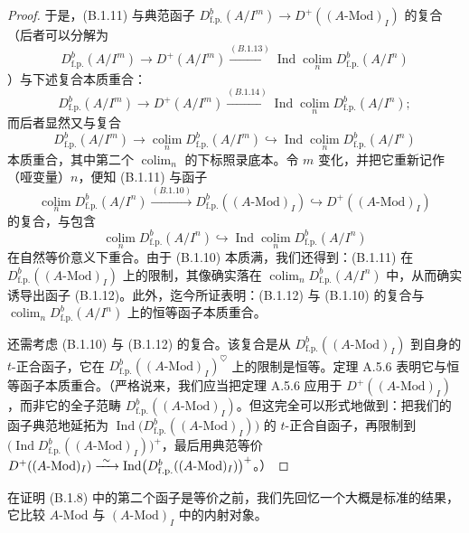 \begin{proof}
于是，(B.1.11) 与典范函子 $D^b_{\mathrm{f.p.}}(A/I^m)\to D^+((A\text{-}\mathrm{Mod})_I)$ 的复合（后者可以分解为
\[
D^b_{\mathrm{f.p.}}(A/I^m)\to D^+(A/I^m)\xrightarrow{(B.1.13)}\operatorname{Ind}\operatorname*{colim}_n D^b_{\mathrm{f.p.}}(A/I^n)
\]
）与下述复合本质重合：
\[
D^b_{\mathrm{f.p.}}(A/I^m)\to D^+(A/I^m)\xrightarrow{(B.1.14)}\operatorname{Ind}\operatorname*{colim}_n D^b_{\mathrm{f.p.}}(A/I^n);
\]
而后者显然又与复合
\[
D^b_{\mathrm{f.p.}}(A/I^m)\to\operatorname*{colim}_n D^b_{\mathrm{f.p.}}(A/I^m)\hookrightarrow\operatorname{Ind}\operatorname*{colim}_n D^b_{\mathrm{f.p.}}(A/I^n)
\]
本质重合，其中第二个 $\operatorname{colim}_n$ 的下标照录底本。令 $m$ 变化，并把它重新记作（哑变量）$n$，便知 (B.1.11) 与函子
\[
\operatorname*{colim}_n D^b_{\mathrm{f.p.}}(A/I^n)\xrightarrow{(B.1.10)}D^b_{\mathrm{f.p.}}((A\text{-}\mathrm{Mod})_I)\hookrightarrow D^+((A\text{-}\mathrm{Mod})_I)
\]
的复合，与包含
\[
\operatorname*{colim}_n D^b_{\mathrm{f.p.}}(A/I^n)\hookrightarrow\operatorname{Ind}\operatorname*{colim}_n D^b_{\mathrm{f.p.}}(A/I^n)
\]
在自然等价意义下重合。由于 (B.1.10) 本质满，我们还得到：(B.1.11) 在 $D^b_{\mathrm{f.p.}}((A\text{-}\mathrm{Mod})_I)$ 上的限制，其像确实落在 $\operatorname*{colim}_n D^b_{\mathrm{f.p.}}(A/I^n)$ 中，从而确实诱导出函子 (B.1.12)。此外，迄今所证表明：(B.1.12) 与 (B.1.10) 的复合与 $\operatorname*{colim}_n D^b_{\mathrm{f.p.}}(A/I^n)$ 上的恒等函子本质重合。

还需考虑 (B.1.10) 与 (B.1.12) 的复合。该复合是从 $D^b_{\mathrm{f.p.}}((A\text{-}\mathrm{Mod})_I)$ 到自身的 $t$-正合函子，它在 $D^b_{\mathrm{f.p.}}((A\text{-}\mathrm{Mod})_I)^{\heartsuit}$ 上的限制是恒等。定理 A.5.6 表明它与恒等函子本质重合。（严格说来，我们应当把定理 A.5.6 应用于 $D^+((A\text{-}\mathrm{Mod})_I)$，而非它的全子范畴 $D^b_{\mathrm{f.p.}}((A\text{-}\mathrm{Mod})_I)$。但这完全可以形式地做到：把我们的函子典范地延拓为 $\operatorname{Ind}\bigl(D^b_{\mathrm{f.p.}}((A\text{-}\mathrm{Mod})_I)\bigr)$ 的 $t$-正合自函子，再限制到 $\bigl(\operatorname{Ind}D^b_{\mathrm{f.p.}}((A\text{-}\mathrm{Mod})_I)\bigr)^+$，最后用典范等价 $D^+((A\text{-}\mathrm{Mod})_I)\xrightarrow{\ \sim\ }\operatorname{Ind}\bigl(D^b_{\mathrm{f.p.}}((A\text{-}\mathrm{Mod})_I)\bigr)^+$。）
\end{proof}

在证明 (B.1.8) 中的第二个函子是等价之前，我们先回忆一个大概是标准的结果，它比较 $A$-$\mathrm{Mod}$ 与 $(A\text{-}\mathrm{Mod})_I$ 中的内射对象。

